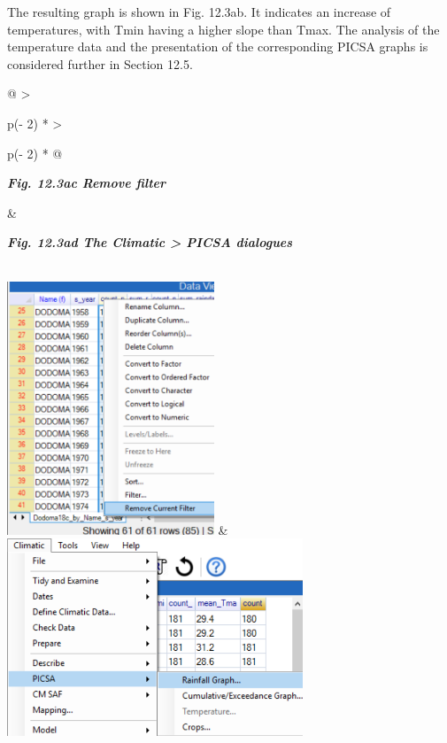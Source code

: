 \documentclass[
  letterpaper,
  DIV=11,
  numbers=noendperiod]{scrreprt}
\begin{document}
The resulting graph is shown in Fig. 12.3ab. It indicates an increase of
temperatures, with Tmin having a higher slope than Tmax. The analysis of
the temperature data and the presentation of the corresponding PICSA
graphs is considered further in Section 12.5.

\begin{longtable}[]{@{}
  >{\raggedright\arraybackslash}p{(\columnwidth - 2\tabcolsep) * }
  >{\raggedright\arraybackslash}p{(\columnwidth - 2\tabcolsep) * }@{}}
\toprule\noalign{}
\begin{minipage}[b]{\linewidth}\raggedright
\textbf{\emph{Fig. 12.3ac Remove filter}}
\end{minipage} & \begin{minipage}[b]{\linewidth}\raggedright
\textbf{\emph{Fig. 12.3ad The Climatic \textgreater{} PICSA dialogues}}
\end{minipage} \\
\midrule\noalign{}
\endhead
\bottomrule\noalign{}
\endlastfoot
\includegraphics[width=2.43495in,height=2.98293in]{figures/Fig12.3ac.png}
&
\includegraphics[width=3.48315in,height=2.31285in]{figures/Fig12.3ad.png} \\
\end{longtable}
\end{document}
